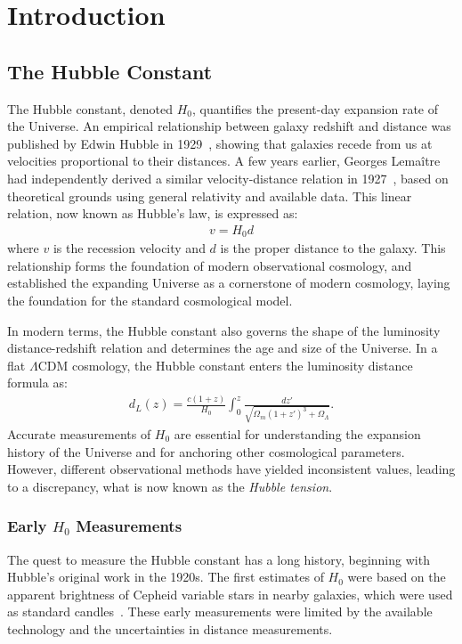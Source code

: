\chapter{Introduction}
\label{chap:introduction}

\section{The Hubble Constant}
The Hubble constant, denoted $H_0$, quantifies the present-day expansion rate of the Universe. An empirical relationship between galaxy redshift and distance was published by Edwin Hubble in 1929~\citep{hubble1929}, showing that galaxies recede from us at velocities proportional to their distances. A few years earlier, Georges Lemaître had independently derived a similar velocity-distance relation in 1927~\citep{lemaitre1927univers}, based on theoretical grounds using general relativity and available data. This linear relation, now known as Hubble's law, is expressed as:
\begin{align}
    v = H_0 d
\end{align}
where $v$ is the recession velocity and $d$ is the proper distance to the galaxy. This relationship forms the foundation of modern observational cosmology, and established the expanding Universe as a cornerstone of modern cosmology, laying the foundation for the standard cosmological model. 

In modern terms, the Hubble constant also governs the shape of the luminosity distance-redshift relation and determines the age and size of the Universe. In a flat $\Lambda$CDM cosmology, the Hubble constant enters the luminosity distance formula as:
\begin{align}
    d_L(z) = \frac{c(1+z)}{H_0} \int_0^z \frac{dz'}{\sqrt{\Omega_m(1+z')^3 + \Omega_\Lambda}}.
\end{align}
Accurate measurements of $H_0$ are essential for understanding the expansion history of the Universe and for anchoring other cosmological parameters. However, different observational methods have yielded inconsistent values, leading to a discrepancy, what is now known as the \textit{Hubble tension}.

\subsection{Early $H_0$ Measurements}
The quest to measure the Hubble constant has a long history, beginning with Hubble's original work in the 1920s. The first estimates of $H_0$ were based on the apparent brightness of Cepheid variable stars in nearby galaxies, which were used as standard candles~\citep{hubble1929}. These early measurements were limited by the available technology and the uncertainties in distance measurements.

